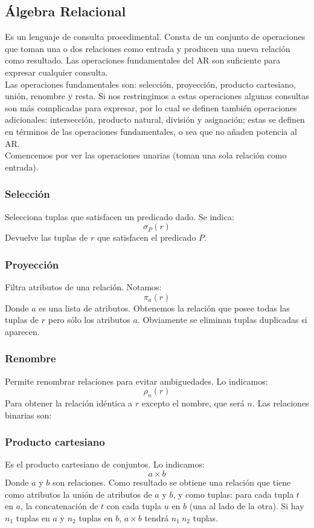 \documentclass[a4paper]{article}
\begin{document}
\subsection{\'Algebra Relacional}
Es un lenguaje de consulta procedimental. Consta de un conjunto de operaciones que toman
una o dos relaciones como entrada y producen una nueva relaci\'on como resultado. Las
operaciones fundamentales del AR son suficiente para expresar cualquier consulta. \\
Las operaciones fundamentales son: selecci\'on, proyecci\'on, producto cartesiano, uni\'on,
renombre y resta. Si nos restringimos a estas operaciones algunas consultas son m\'as
complicadas para expresar, por lo cual se definen tambi\'en operaciones adicionales:
intersecci\'on, producto natural, divisi\'on y asignaci\'on; estas se definen en t\'erminos
de las operaciones fundamentales, o sea que no añaden potencia al AR. \\
Comencemos por ver las operaciones unarias (toman una sola relaci\'on como entrada).
\subsubsection*{Selecci\'on}
Selecciona tuplas que satisfacen un predicado dado. Se indica:
$$ \sigma_{P}(r) $$
Devuelve las tuplas de $r$ que satisfacen el predicado $P$.
\subsubsection*{Proyecci\'on}
Filtra atributos de una relaci\'on. Notamos:
$$ \pi_{a}(r) $$
Donde $a$ es una lista de atributos. Obtenemos la relaci\'on que posee todas las tuplas
de $r$ pero s\'olo los atributos $a$. Obviamente se eliminan tuplas duplicadas si aparecen.
\subsubsection*{Renombre}
Permite renombrar relaciones para evitar ambiguedades. Lo indicamos:
$$ \rho_{n}(r) $$
Para obtener la relaci\'on id\'entica a $r$ excepto el nombre, que ser\'a $n$.
Las relaciones binarias son:
\subsubsection*{Producto cartesiano}
Es el producto cartesiano de conjuntos. Lo indicamos:
$$ a \times b $$
Donde $a$ y $b$ son relaciones. Como resultado se obtiene una relaci\'on que tiene como
atributos la uni\'on de atributos de $a$ y $b$, y como tuplas: para cada tupla $t$ en $a$,
la concatenaci\'on de $t$ con cada tupla $u$ en $b$ (una al lado de la otra). Si hay
$n_{1}$ tuplas en $a$ y $n_{2}$ tuplas en $b$, $a \times b$ tendr\'a $n_{1}\: n_{2}$ tuplas.
\end{document}
